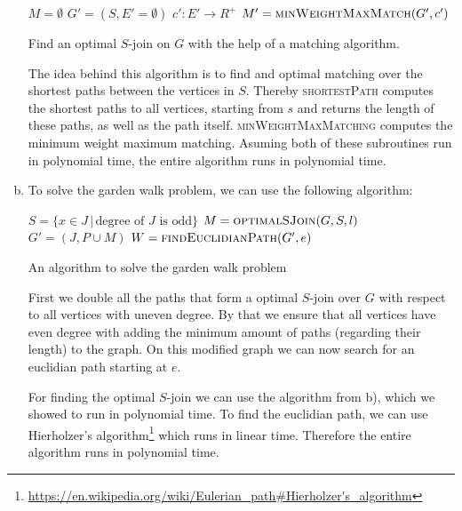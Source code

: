 \documentclass[a4paper,12pt,headsepline]{scrartcl}
\begin{document}
\begin{enumerate}[a)]
    \begin{algorithm}[H]
      \SetAlgoLined
      $M = \emptyset$\;
      $G' = (S, E'=\emptyset)$\;
      $c':E'\rightarrow R^+$\;
      $M' = \textsc{minWeightMaxMatch}(G',c')$\;
      \caption{Find an optimal $S$-join on $G$ with the help of a matching algorithm.}
    \end{algorithm}

    The idea behind this algorithm is to find and optimal matching over the shortest paths between the vertices in $S$.
    Thereby \textsc{shortestPath} computes the shortest paths to all vertices, starting from $s$ and returns the length of these paths, as well as the path itself.
    \textsc{minWeightMaxMatching} computes the minimum weight maximum matching.
    Asuming both of these subroutines run in polynomial time, the entire algorithm runs in polynomial time.

  \item
    To solve the garden walk problem, we can use the following algorithm:

    \begin{algorithm}[H]
      \SetAlgoLined
      $S = \{x\in J\,|\,\text{degree of $J$ is odd}\}$\;
      $M = \textsc{optimalSJoin}(G,S,l)$\;
      $G' = (J, P\cup M)$\;
      $W = \textsc{findEuclidianPath}(G',e)$\;
      \caption{An algorithm to solve the garden walk problem}
    \end{algorithm}

    First we double all the paths that form a optimal $S$-join over $G$ with respect to all vertices with uneven degree.
    By that we ensure that all vertices have even degree with adding the minimum amount of paths (regarding their length) to the graph.
    On this modified graph we can now search for an euclidian path starting at $e$.

    For finding the optimal $S$-join we can use the algorithm from b), which we showed to run in polynomial time.
    To find the euclidian path, we can use Hierholzer's algorithm\footnote{\url{https://en.wikipedia.org/wiki/Eulerian_path\#Hierholzer's_algorithm}} which runs in linear time.
    Therefore the entire algorithm runs in polynomial time.
\end{enumerate}
\end{document}
